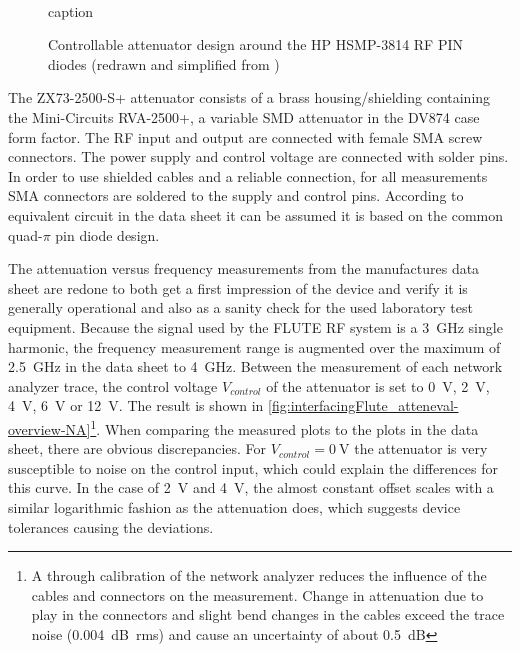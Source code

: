 \begin{figure}[tb]
    \centering
		\\
		\caption{caption}
    \label{fig:attenPhotoAndEquiC}
\end{figure}

\begin{figure}[tb]
    \centering
	
	\caption{Controllable attenuator design around the HP HSMP-3814 RF PIN diodes (redrawn and simplified from \cite{waughLowCostSurfaceMount1992})}
    \label{fig:quadPiequiC}
\end{figure}




The ZX73-2500-S+ attenuator consists of a brass housing/shielding containing the Mini-Circuits RVA-2500+, a variable SMD attenuator in the DV874 case form factor. The RF input and output are connected with female SMA screw connectors. The power supply and control voltage are connected with solder pins. In order to use shielded cables and a reliable connection, for all measurements SMA connectors are soldered to the supply and control pins. According to equivalent circuit in the data sheet\cite{mini-circuitsZX732500VoltageVariable} it can be assumed it is based on the common quad-$\pi$ pin diode design\cite{waughLowCostSurfaceMount1992}.

The attenuation versus frequency measurements from the manufactures data sheet are redone to both get a first impression of the device and verify it is generally operational and also as a sanity check for the used laboratory test equipment.
Because the signal used by the FLUTE RF system is a \SI{3}{\GHz} single harmonic, the frequency measurement range is augmented over the maximum of \SI{2.5}{\GHz} in the data sheet to \SI{4}{\GHz}.
Between the measurement of each network analyzer trace, the control voltage $V_{control}$ of the attenuator is set to \SI{0}{\volt}, \SI{2}{\volt}, \SI{4}{\volt}, \SI{6}{\volt} or \SI{12}{\volt}.
The result is shown in \autoref{fig:interfacingFlute_atteneval-overview-NA}\footnote{A through calibration of the network analyzer reduces the influence of the cables and connectors on the measurement. Change in attenuation due to play in the connectors and slight bend changes in the cables exceed the trace noise (\SI{0.004}{\dB rms}) and cause an uncertainty of about \SI{0.5}{\dB}}.
When comparing the measured plots to the plots in the data sheet, there are obvious discrepancies. For $V_{control}=\SI{0}{\volt}$ the attenuator is very susceptible to noise on the control input, which could explain the differences for this curve. In the case of \SI{2}{\volt} and \SI{4}{\volt}, the almost constant offset scales with a similar logarithmic fashion as the attenuation does, which suggests device tolerances causing the deviations.

